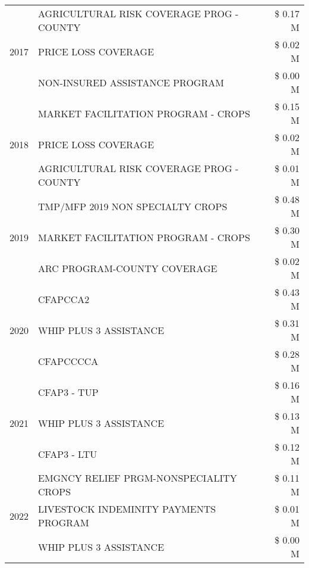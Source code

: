 \begin{tabular}{llr}
\cline{1-3}
\multirow[t]{3}{*}{2017} & AGRICULTURAL RISK COVERAGE PROG - COUNTY & \$ 0.17 M \\
 & PRICE LOSS COVERAGE & \$ 0.02 M \\
 & NON-INSURED ASSISTANCE PROGRAM & \$ 0.00 M \\
\cline{1-3}
\multirow[t]{3}{*}{2018} & MARKET FACILITATION PROGRAM - CROPS & \$ 0.15 M \\
 & PRICE LOSS COVERAGE & \$ 0.02 M \\
 & AGRICULTURAL RISK COVERAGE PROG - COUNTY & \$ 0.01 M \\
\cline{1-3}
\multirow[t]{3}{*}{2019} & TMP/MFP 2019 NON SPECIALTY CROPS & \$ 0.48 M \\
 & MARKET FACILITATION PROGRAM - CROPS & \$ 0.30 M \\
 & ARC PROGRAM-COUNTY COVERAGE & \$ 0.02 M \\
\cline{1-3}
\multirow[t]{3}{*}{2020} & CFAPCCA2 & \$ 0.43 M \\
 & WHIP PLUS 3 ASSISTANCE & \$ 0.31 M \\
 & CFAPCCCCA & \$ 0.28 M \\
\cline{1-3}
\multirow[t]{3}{*}{2021} & CFAP3 - TUP & \$ 0.16 M \\
 & WHIP PLUS 3 ASSISTANCE & \$ 0.13 M \\
 & CFAP3 - LTU & \$ 0.12 M \\
\cline{1-3}
\multirow[t]{3}{*}{2022} & EMGNCY RELIEF PRGM-NONSPECIALITY CROPS & \$ 0.11 M \\
 & LIVESTOCK INDEMINITY PAYMENTS PROGRAM & \$ 0.01 M \\
 & WHIP PLUS 3 ASSISTANCE & \$ 0.00 M \\
\cline{1-3}
\bottomrule
\end{tabular}
